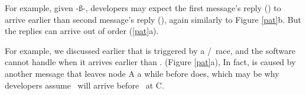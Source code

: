   For
example, given \mcb-\mbc\ss\mca-\mac, developers may expect the first
message's reply (\mbc) to arrive earlier than second message's reply
(\mac), again similarly to Figure \ref{pat}b.  But the replies can
arrive out of order (\ref{pat}a).  

 For
example, we discussed earlier that  is triggered by a
\mbc/\mac\ race, and the software cannot handle \mac{} when it
arrives earlier than \mbc{}.  (Figure \ref{pat}a), In
fact, \mbc{} is caused by another message \mab{} that
leaves node A a while before \mac{} does, which may be
why developers assume \mbc\ will arrive before \mac\ at C.
%
\fi







